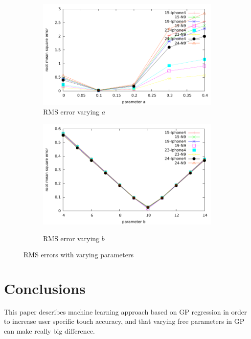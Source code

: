 \documentclass[english,11pt]{article}
\numberwithin{equation}{section}
\begin{document}
\begin{figure}
    \centering
    \begin{subfigure}[b]{0.8\textwidth}
        \includegraphics[width=\textwidth]{error_a}
        \caption{RMS error varying $a$}
        \label{fig:error_a}
    \end{subfigure}

    \begin{subfigure}[b]{0.8\textwidth}
        \caption{RMS error varying $b$}
        \includegraphics[width=\textwidth]{error_b}
        \label{fig:error_b}
    \end{subfigure}
    \caption{RMS errors with varying parameters}\label{fig:aggr}
\end{figure}


\section{Conclusions}
This paper describes machine learning approach based on GP regression in order
to increase user specific touch accuracy, and that varying free parameters in GP
can make really big difference.
\end{document}

